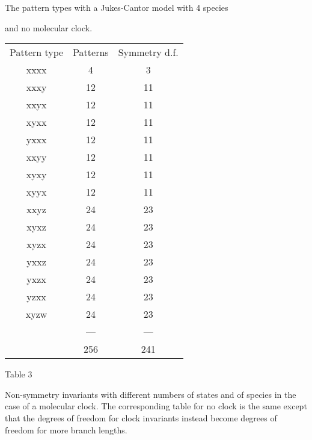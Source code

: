 \centerline{The pattern types with a Jukes-Cantor model with 4 species}
\centerline{and no molecular clock.}
\bigskip

\begin{tabular}{c c c}
\medskip
            Pattern type  &    Patterns   &    Symmetry d.f.\\
               xxxx    &          4       &         3\\
               xxxy    &         12       &        11\\
               xxyx    &         12       &        11\\
               xyxx    &         12       &        11\\
               yxxx    &         12       &        11\\
               xxyy    &         12       &        11\\
               xyxy    &         12       &        11\\
               xyyx    &         12       &        11\\
               xxyz    &         24       &        23\\
               xyxz    &         24       &        23\\
               xyzx    &         24       &        23\\
               yxxz    &         24       &        23\\
               yxzx    &         24       &        23\\
               yzxx    &         24       &        23\\
               xyzw    &         24       &        23\\
                       &        ---       &       ---\\
                       &        256       &       241
\end{tabular}

\newpage

\centerline{Table 3}

Non-symmetry invariants with different numbers of states and of species in the case of a 
molecular clock.  The corresponding table for no clock is the same except
that the degrees of freedom for clock invariants instead become degrees
of freedom for more branch lengths.
\bigskip

